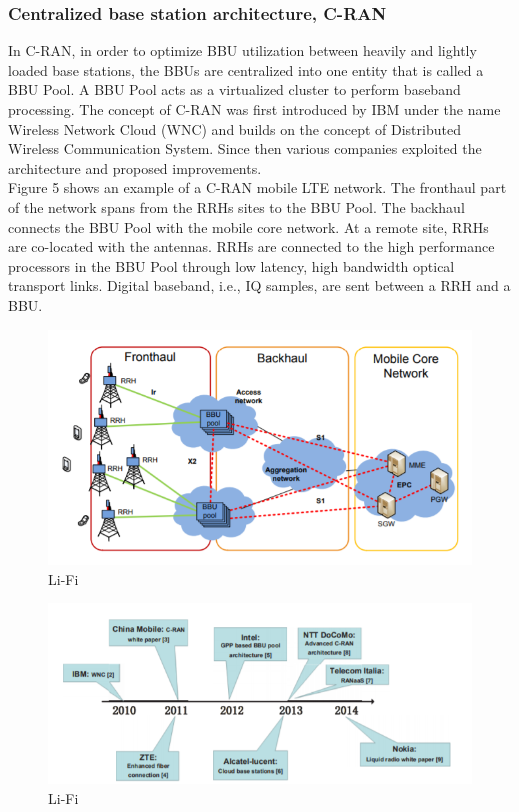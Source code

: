 \documentclass{article}
\begin{document}
\subsubsection{Centralized base station architecture, C-RAN} 
In C-RAN, in order to optimize BBU utilization between
heavily and lightly loaded base stations, the BBUs are 
centralized into one entity that is called a BBU Pool.
A BBU Pool acts as a virtualized cluster to perform baseband processing.
The concept of C-RAN was first introduced by IBM
under the name Wireless Network Cloud (WNC) and builds
on the concept of Distributed Wireless Communication System.
Since then various companies exploited the architecture and 
proposed improvements.\\

Figure 5 shows an example of a C-RAN mobile LTE
network. The fronthaul part of the network spans from the
RRHs sites to the BBU Pool. The backhaul connects the BBU
Pool with the mobile core network. At a remote site, RRHs are
co-located with the antennas. RRHs are connected to the high
performance processors in the BBU Pool through low latency,
high bandwidth optical transport links. Digital baseband, i.e.,
IQ samples, are sent between a RRH and a BBU.


\begin{figure}
  \includegraphics[scale=0.7]{res/LTE_CRAN.PNG}
    \caption{Li-Fi}
  \label{fig:tech-illustration-li-fi}
\end{figure}

\begin{figure}
  \includegraphics{res/arc_trend_CRAN.PNG}
    \caption{Li-Fi}
  \label{fig:tech-illustration-li-fi}
\end{figure}
\end{document}
